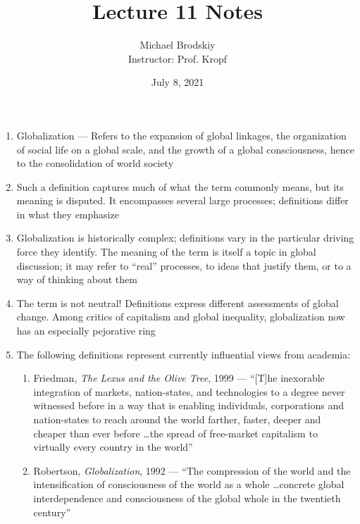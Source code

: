 \documentclass[12pt]{article}
\title{Lecture 11 Notes}
\date{July 8, 2021}
\author{Michael Brodskiy\\ \small Instructor: Prof. Kropf}
\begin{document}
    \maketitle

    \begin{enumerate}

      \item Globalization — Refers to the expansion of global linkages, the organization of social life on a global scale, and the growth of a global consciousness, hence to the consolidation of world society
        
      \item Such a definition captures much of what the term commonly means, but its meaning is disputed. It encompasses several large processes; definitions differ in what they emphasize

      \item Globalization is historically complex; definitions vary in the particular driving force they identify. The meaning of the term is itself a topic in global discussion; it may refer to “real” processes, to ideas that justify them, or to a way of thinking about them

      \item The term is not neutral!  Definitions express different assessments of global change. Among critics of capitalism and global inequality, globalization now has an especially pejorative ring

      \item The following definitions represent currently influential views from academia:

        \begin{enumerate}

          \item Friedman, \textit{The Lexus and the Olive Tree}, 1999 — “[T]he inexorable integration of markets, nation-states, and technologies to a degree never witnessed before in a way that is enabling individuals, corporations and nation-states to reach around the world farther, faster, deeper and cheaper than ever before \dots the spread of free-market capitalism to virtually every country in the world” 

          \item Robertson, \textit{Globalization}, 1992 — “The compression of the world and the intensification of consciousness of the world as a whole \dots concrete global interdependence and consciousness of the global whole in the twentieth century”


\end{enumerate}
\end{enumerate}
\end{document}
